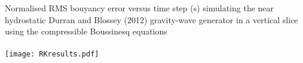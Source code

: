 \begin{slide}

\ \\ \ \\
Normalised RMS bouyancy error versus time step (s) simulating the near hydrostatic  Durran and Blossey (2012) gravity-wave generator in a vertical slice using the compressible Boussinesq equations
\ \\ \ \\
\texttt{[image: RKresults.pdf]}

\end{slide}

